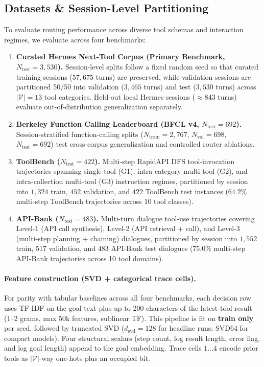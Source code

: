 \documentclass[10pt,twocolumn,letterpaper]{article}
\begin{document}
\subsection{Datasets \& Session-Level Partitioning}
To evaluate routing performance across diverse tool schemas and interaction regimes, we evaluate across four benchmarks:
\begin{enumerate}[leftmargin=1.5em, itemsep=0.05em]
  \item \textbf{Curated Hermes Next-Tool Corpus (Primary Benchmark, $N_{\text{test}}=3{,}530$).} Session-level splits follow a fixed random seed so that curated training sessions ($57{,}675$ turns) are preserved, while validation sessions are partitioned 50/50 into validation ($3{,}465$ turns) and test ($3{,}530$ turns) across $|\mathcal{V}|=13$ tool categories. Held-out local Hermes sessions ($\approx 843$ turns) evaluate out-of-distribution generalization separately.
  \item \textbf{Berkeley Function Calling Leaderboard (BFCL v4, $N_{\text{test}}=692$).} Session-stratified function-calling splits ($N_{\text{train}}=2{,}767$, $N_{\text{val}}=698$, $N_{\text{test}}=692$) test cross-corpus generalization and controlled router ablations.
  \item \textbf{ToolBench ($N_{\text{test}}=422$).} Multi-step RapidAPI DFS tool-invocation trajectories spanning single-tool (G1), intra-category multi-tool (G2), and intra-collection multi-tool (G3) instruction regimes, partitioned by session into $1{,}324$ train, $452$ validation, and $422$ ToolBench test instances ($64.2\%$ multi-step ToolBench trajectories across 10 tool classes).
  \item \textbf{API-Bank ($N_{\text{test}}=483$).} Multi-turn dialogue tool-use trajectories covering Level-1 (API call synthesis), Level-2 (API retrieval + call), and Level-3 (multi-step planning + chaining) dialogues, partitioned by session into $1{,}552$ train, $517$ validation, and $483$ API-Bank test dialogues ($75.0\%$ multi-step API-Bank trajectories across 10 tool domains).
\end{enumerate}

\paragraph{Feature construction (SVD + categorical trace cells).}
For parity with tabular baselines across all four benchmarks, each decision row uses TF-IDF on the goal text plus up to 200 characters of the latest tool result (1--2 grams, max 50k features, sublinear TF). This pipeline is fit on \textbf{train only} per seed, followed by truncated SVD ($d_{\text{svd}}=128$ for headline runs; SVD64 for compact models). Four structural scalars (step count, log result length, error flag, and log goal length) append to the goal embedding. Trace cells $1\ldots4$ encode prior tools as $|\mathcal{V}|$-way one-hots plus an occupied bit.
\end{document}
